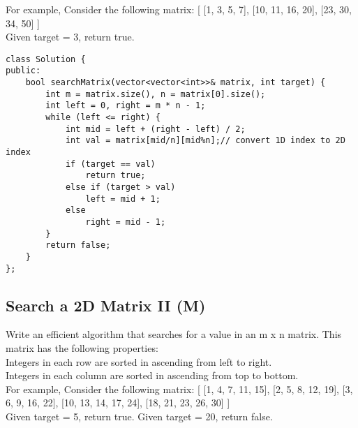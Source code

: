 For example,
Consider the following matrix:
[
  [1,   3,  5,  7],
  [10, 11, 16, 20],
  [23, 30, 34, 50]
]\\
Given target = 3, return true.\\

\begin{lstlisting}
class Solution {
public:
    bool searchMatrix(vector<vector<int>>& matrix, int target) {
        int m = matrix.size(), n = matrix[0].size();
        int left = 0, right = m * n - 1;
        while (left <= right) {
            int mid = left + (right - left) / 2;
            int val = matrix[mid/n][mid%n];// convert 1D index to 2D index
            if (target == val)
                return true;
            else if (target > val)
                left = mid + 1;
            else
                right = mid - 1;
        }
        return false;
    }
};
\end{lstlisting}


\subsection{Search a 2D Matrix II (M)}
Write an efficient algorithm that searches for a value in an m x n matrix. This matrix has the following properties:\\
    Integers in each row are sorted in ascending from left to right.\\
    Integers in each column are sorted in ascending from top to bottom.\\

For example,
Consider the following matrix:
[
  [1,   4,  7, 11, 15],
  [2,   5,  8, 12, 19],
  [3,   6,  9, 16, 22],
  [10, 13, 14, 17, 24],
  [18, 21, 23, 26, 30]
]\\
Given target = 5, return true. Given target = 20, return false.\\


